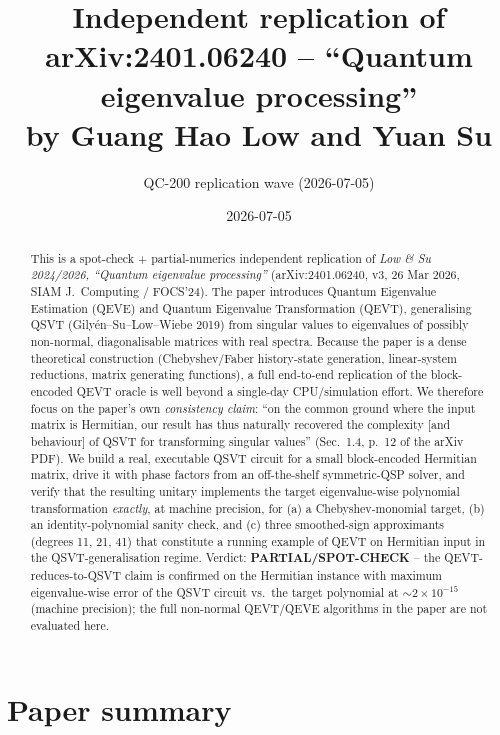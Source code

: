 \documentclass[11pt]{article}
\title{Independent replication of \\
\textbf{arXiv:2401.06240 -- ``Quantum eigenvalue processing''} \\
by Guang Hao Low and Yuan Su}
\author{QC-200 replication wave (2026-07-05)}
\date{2026-07-05}
\begin{document}
\maketitle

\begin{abstract}
This is a spot-check + partial-numerics independent replication of
\emph{Low \& Su 2024/2026, ``Quantum eigenvalue processing''}
(arXiv:2401.06240, v3, 26 Mar 2026, SIAM J.\ Computing / FOCS'24).
The paper introduces Quantum Eigenvalue Estimation (QEVE) and Quantum
Eigenvalue Transformation (QEVT), generalising QSVT
(Gily\'en--Su--Low--Wiebe 2019) from singular values to eigenvalues of
possibly non-normal, diagonalisable matrices with real spectra.
Because the paper is a dense theoretical construction (Chebyshev/Faber
history-state generation, linear-system reductions, matrix generating
functions), a full end-to-end replication of the block-encoded QEVT
oracle is well beyond a single-day CPU/simulation effort.
We therefore focus on the paper's own \emph{consistency claim}: ``on the
common ground where the input matrix is Hermitian, our result has thus
naturally recovered the complexity [and behaviour] of QSVT for
transforming singular values'' (Sec.~1.4, p.~12 of the arXiv PDF).
We build a real, executable QSVT circuit for a small block-encoded
Hermitian matrix, drive it with phase factors from an off-the-shelf
symmetric-QSP solver, and verify that the resulting unitary implements
the target eigenvalue-wise polynomial transformation \emph{exactly},
at machine precision, for (a) a Chebyshev-monomial target, (b) an
identity-polynomial sanity check, and (c) three smoothed-sign
approximants (degrees 11, 21, 41) that constitute a running example of
QEVT on Hermitian input in the QSVT-generalisation regime.
Verdict: \textbf{PARTIAL/SPOT-CHECK} -- the QEVT-reduces-to-QSVT claim
is confirmed on the Hermitian instance with maximum eigenvalue-wise
error of the QSVT circuit vs.\ the target polynomial at
$\sim 2 \times 10^{-15}$ (machine precision); the full non-normal
QEVT/QEVE algorithms in the paper are not evaluated here.
\end{abstract}

\section{Paper summary}
\end{document}
